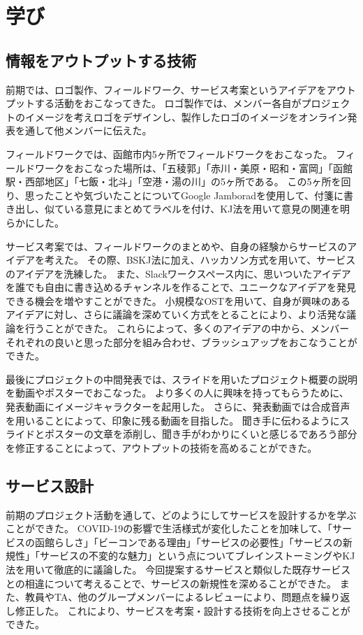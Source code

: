 \chapter{学び}

\section{情報をアウトプットする技術}
前期では、ロゴ製作、フィールドワーク、サービス考案というアイデアをアウトプットする活動をおこなってきた。
ロゴ製作では、メンバー各自がプロジェクトのイメージを考えロゴをデザインし、製作したロゴのイメージをオンライン発表を通して他メンバーに伝えた。

フィールドワークでは、函館市内5ヶ所でフィールドワークをおこなった。
フィールドワークをおこなった場所は、「五稜郭」「赤川・美原・昭和・富岡」「函館駅・西部地区」「七飯・北斗」「空港・湯の川」の5ヶ所である。
この5ヶ所を回り、思ったことや気づいたことについてGoogle Jamboradを使用して、付箋に書き出し、似ている意見にまとめてラベルを付け、KJ法を用いて意見の関連を明らかにした。

サービス考案では、フィールドワークのまとめや、自身の経験からサービスのアイデアを考えた。
その際、BSKJ法に加え、ハッカソン方式を用いて、サービスのアイデアを洗練した。
また、Slackワークスペース内に、思いついたアイデアを誰でも自由に書き込めるチャンネルを作ることで、ユニークなアイデアを発見できる機会を増やすことができた。
小規模なOSTを用いて、自身が興味のあるアイデアに対し、さらに議論を深めていく方式をとることにより、より活発な議論を行うことができた。
これらによって、多くのアイデアの中から、メンバーそれぞれの良いと思った部分を組み合わせ、ブラッシュアップをおこなうことができた。

最後にプロジェクトの中間発表では、スライドを用いたプロジェクト概要の説明を動画やポスターでおこなった。
より多くの人に興味を持ってもらうために、発表動画にイメージキャラクターを起用した。
さらに、発表動画では合成音声を用いることによって、印象に残る動画を目指した。
聞き手に伝わるようにスライドとポスターの文章を添削し、聞き手がわかりにくいと感じるであろう部分を修正することによって、アウトプットの技術を高めることができた。

\section{サービス設計}
前期のプロジェクト活動を通して、どのようにしてサービスを設計するかを学ぶことができた。
COVID-19の影響で生活様式が変化したことを加味して、「サービスの函館らしさ」「ビーコンである理由」「サービスの必要性」「サービスの新規性」「サービスの不変的な魅力」という点についてブレインストーミングやKJ法を用いて徹底的に議論した。
今回提案するサービスと類似した既存サービスとの相違について考えることで、サービスの新規性を深めることができた。
また、教員やTA、他のグループメンバーによるレビューにより、問題点を繰り返し修正した。
これにより、サービスを考案・設計する技術を向上させることができた。

